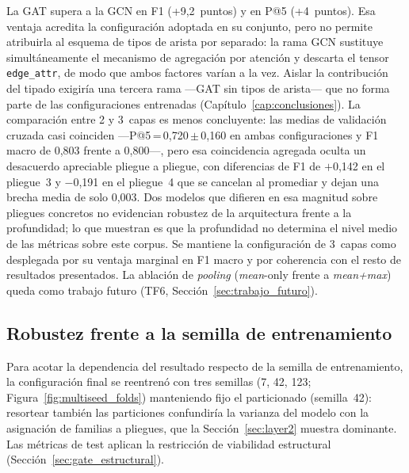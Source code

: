 La \ac{GAT} supera a la \ac{GCN} en F1 (+9,2~puntos) y en P@5 (+4~puntos). Esa
ventaja acredita la configuración adoptada en su conjunto, pero no permite
atribuirla al esquema de tipos de arista por separado: la rama \ac{GCN} sustituye
simultáneamente el mecanismo de agregación por atención y descarta el tensor
\texttt{edge\_attr}, de modo que ambos factores varían a la vez. Aislar la
contribución del tipado exigiría una tercera rama —\ac{GAT} sin tipos de arista—
que no forma parte de las configuraciones entrenadas
(Capítulo~\ref{cap:conclusiones}). La comparación entre 2 y 3~capas es
menos concluyente: las medias de validación cruzada casi coinciden
—P@5\,=\,0,720\,\(\pm\)\,0,160 en ambas configuraciones y F1 macro de 0,803
frente a 0,800\mbox{—,} pero esa coincidencia agregada oculta un desacuerdo apreciable
pliegue a pliegue, con diferencias de F1 de \(+\)0,142 en el pliegue~3 y
\(-\)0,191 en el pliegue~4 que se cancelan al promediar y dejan una brecha media
de solo 0,003. Dos modelos que difieren en esa magnitud sobre pliegues concretos
no evidencian robustez de la arquitectura frente a la profundidad; lo que
muestran es que la profundidad no determina el nivel medio de las métricas sobre
este corpus. Se
mantiene la configuración de 3~capas como desplegada por su ventaja marginal en
F1 macro y por coherencia con el resto de resultados presentados. La
ablación de \textit{pooling} (\textit{mean}-only frente a \textit{mean+max}) queda
como trabajo futuro (TF6, Sección~\ref{sec:trabajo_futuro}).

\subsection{Robustez frente a la semilla de entrenamiento}
\label{sec:multisemilla}

Para acotar la dependencia del resultado respecto de la semilla de entrenamiento,
la configuración final se reentrenó con tres semillas (7, 42, 123;
Figura~\ref{fig:multiseed_folds}) manteniendo fijo el particionado (semilla~42):
resortear también las particiones confundiría la varianza del modelo con la
asignación de familias a pliegues, que la Sección~\ref{sec:layer2} muestra
dominante. Las métricas de test aplican la restricción de viabilidad estructural
(Sección~\ref{sec:gate_estructural}).

